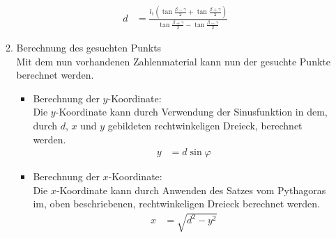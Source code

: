 \begin{itemize}
\begin{enumerate}
\begin{align*}
d & = \frac{l_1 (\tan  \frac{\beta - \gamma}{2} + \tan \frac{\beta + \gamma}{2})}{\tan \frac{\beta + \gamma}{2} - \tan \frac{\beta-\gamma}{2}}
\end{align*}
\item Berechnung des gesuchten Punkts\\
Mit dem nun vorhandenen Zahlenmaterial kann nun der gesuchte Punkte berechnet werden.
\begin{itemize}
\item Berechnung der $y$-Koordinate:\\
Die $y$-Koordinate kann durch Verwendung der Sinusfunktion in dem, durch $d$, $x$ und $y$ gebildeten rechtwinkeligen Dreieck, berechnet werden.
\begin{align*}
y & = d \sin \varphi
\end{align*}
\item Berechnung der $x$-Koordinate:\\
Die $x$-Koordinate kann durch Anwenden des Satzes vom Pythagoras im, oben beschriebenen, rechtwinkeligen Dreieck berechnet werden.
\begin{align*}
x & = \sqrt{d^2 - y^2}
\end{align*}


\end{itemize}
\end{enumerate}
\end{itemize}
